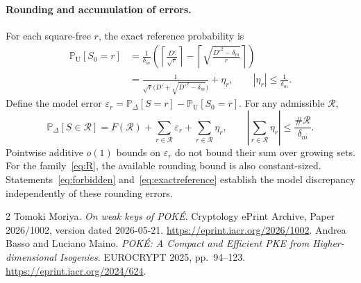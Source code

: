 \documentclass[a4paper,11pt]{article}
\theoremstyle{remark}
\newcommand{\Rset}{\mathcal R}
\newcommand{\PrD}{\mathbb P_{\Delta}}
\newcommand{\PrU}{\mathbb P_{\mathrm U}}
\begin{document}
\paragraph{Rounding and accumulation of errors.}
For each square-free $r$, the exact reference probability is
\begin{align*}
 \PrU[S_0=r]
 &=\frac1{\delta_m}
 \left(
  \left\lceil\frac{D'}{\sqrt r}\right\rceil
  -\left\lceil\sqrt{\frac{D'^2-\delta_m}{r}}\right\rceil
 \right)\\
 &=\frac1{\sqrt r\bigl(D'+\sqrt{D'^2-\delta_m}\bigr)}
   +\eta_r,\qquad |\eta_r|\le\frac1{\delta_m}.
\end{align*}
Define the model error
$\varepsilon_r=\PrD[S=r]-\PrU[S_0=r]$. For any admissible $\Rset$,
\begin{equation}\label{eq:errors}
 \PrD[S\in\Rset]
 =F(\Rset)+\sum_{r\in\Rset}\varepsilon_r
           +\sum_{r\in\Rset}\eta_r,
 \qquad
 \left|\sum_{r\in\Rset}\eta_r\right|
 \le\frac{\#\Rset}{\delta_m}.
\end{equation}
Pointwise additive $o(1)$ bounds on $\varepsilon_r$ do not bound their
sum over growing sets. For the family~\eqref{eq:R}, the available
rounding bound is also constant-sized. Statements~\eqref{eq:forbidden}
and~\eqref{eq:exactreference} establish the model discrepancy independently
of these rounding errors.

\begin{thebibliography}{2}
Tomoki Moriya.
\newblock \emph{On weak keys of POK\'E}.
\newblock Cryptology ePrint Archive, Paper 2026/1002,
version dated 2026-05-21.
\newblock \url{https://eprint.iacr.org/2026/1002}.
Andrea Basso and Luciano Maino.
\newblock \emph{POK\'E: A Compact and Efficient PKE from
Higher-dimensional Isogenies}.
\newblock EUROCRYPT 2025, pp.~94--123.
\newblock \url{https://eprint.iacr.org/2024/624}.
\end{thebibliography}
\end{document}
